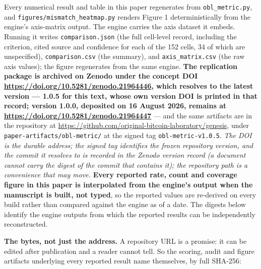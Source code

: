\documentclass[
]{article}
\begin{document}
Every numerical result and table in this paper regenerates from
\texttt{obl\_metric.py}, and \texttt{figures/mismatch\_heatmap.py}
renders Figure 1 deterministically from the engine's axis-matrix output.
The engine carries the axis dataset it embeds. Running it writes
\texttt{comparison.json} (the full cell-level record, including the
criterion, cited source and confidence for each of the 152 cells, 34 of
which are unspecified), \texttt{comparison.csv} (the summary), and
\texttt{axis\_matrix.csv} (the raw axis values); the figure regenerates
from the same engine. \textbf{The replication package is archived on
Zenodo under the concept DOI
\url{https://doi.org/10.5281/zenodo.21964446}, which resolves to the
latest version --- 1.0.5 for this text, whose own version DOI is printed
in that record; version 1.0.0, deposited on 16 August 2026, remains at
\url{https://doi.org/10.5281/zenodo.21964447}} --- and the same
artifacts are in the repository at
\url{https://github.com/original-bitcoin-laboratory/genesis}, under
\texttt{paper-artifacts/obl-metric/} at the signed tag
\texttt{obl-metric-v1.0.5}. \emph{The DOI is the durable address; the
signed tag identifies the frozen repository version, and the commit it
resolves to is recorded in the Zenodo version record (a document cannot
carry the digest of the commit that contains it); the repository path is
a convenience that may move.} \textbf{Every reported rate, count and
coverage figure in this paper is interpolated from the engine's output
when the manuscript is built, not typed}, so the reported values are
re-derived on every build rather than compared against the engine as of
a date. The digests below identify the engine outputs from which the
reported results can be independently reconstructed.

\textbf{The bytes, not just the address.} A repository URL is a promise:
it can be edited after publication and a reader cannot tell. So the
scoring, audit and figure artifacts underlying every reported result
name themselves, by full SHA-256:
\end{document}
